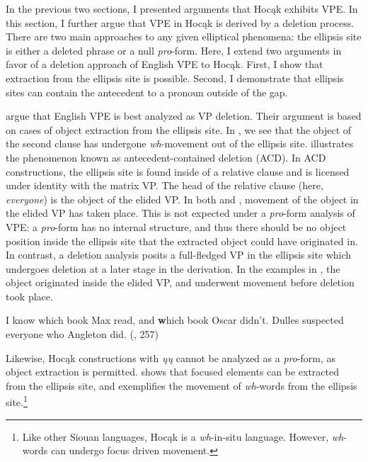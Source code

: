 \documentclass[output=paper]{LSP/langsci}
\begin{document}
In the previous two sections, I presented arguments that Hocąk exhibits VPE. In this section, I further argue that VPE in Hocąk is derived by a deletion process. There are two main approaches to any given elliptical phenomena: the ellipsis site is either a deleted phrase or a null \emph{pro}-form. Here, I extend two arguments in favor of a deletion approach of English VPE to Hocąk. First, I show that extraction from the ellipsis site is possible. Second, I demonstrate that ellipsis sites can contain the antecedent to a pronoun outside of the gap.

\citet{FiengoMay1994} argue that English VPE is best analyzed as VP deletion. Their argument is based on cases of object extraction from the ellipsis site. In , we see that the object of the second clause has undergone \emph{wh}-movement out of the ellipsis site.  illustrates the phenomenon known as antecedent-contained deletion (ACD). In ACD constructions, the ellipsis site is found inside of a relative clause and is licensed under identity with the matrix VP. The head of the relative clause (here, \emph{everyone}) is the object of the elided VP. In both  and , movement of the object in the elided VP has taken place. This is not expected under a \emph{pro}-form analysis of VPE: a \emph{pro}-form has no internal structure, and thus there should be no object position inside the ellipsis site that the extracted object could have originated in. In contrast, a deletion analysis posits a full-fledged VP in the ellipsis site which undergoes deletion at a later stage in the derivation. In the examples in , the object originated inside the elided VP, and underwent movement before deletion took place.

\ea\label{ex:johnson:46}
\ea\label{ex:johnson:46a}
I know which book Max read, and {\textbf which book} Oscar didn't.
\ex\label{ex:johnson:46b}
Dulles suspected everyone who Angleton did. (\citealt[229]{FiengoMay1994}, 257)
\z
\z

Likewise, Hocąk constructions with \emph{ųų} cannot be analyzed as a \emph{pro}-form, as object extraction is permitted.  shows that focused elements can be extracted from the ellipsis site, and  exemplifies the movement of \emph{wh}-words from the ellipsis site.\footnote{Like other Siouan languages, Hocąk is a \emph{wh}-in-situ language. However, \emph{wh}-words can undergo focus driven movement.}
\end{document}
